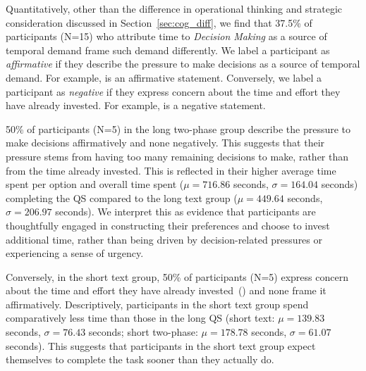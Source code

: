 Quantitatively, other than the difference in operational thinking and strategic consideration discussed in Section~\ref{sec:cog_diff}, we find that 37.5\% of participants (N=15) who attribute time to \textit{Decision Making} as a source of temporal demand frame such demand differently. We label a participant as \textit{affirmative} if they describe the pressure to make decisions as a source of temporal demand. For example,  is an affirmative statement. Conversely, we label a participant as \textit{negative} if they express concern about the time and effort they have already invested. For example,  is a negative statement.

50\% of participants (N=5) in the long two-phase group describe the pressure to make decisions affirmatively and none negatively. This suggests that their pressure stems from having too many remaining decisions to make, rather than from the time already invested. This is reflected in their higher average time spent per option and overall time spent ($\mu=716.86$ seconds, $\sigma=164.04$ seconds) completing the QS compared to the long text group ($\mu=449.64$ seconds, $\sigma=206.97$ seconds). We interpret this as evidence that participants are thoughtfully engaged in constructing their preferences and choose to invest additional time, rather than being driven by decision-related pressures or experiencing a sense of urgency.

Conversely, in the short text group, 50\% of participants (N=5) express concern about the time and effort they have already invested~() and none frame it affirmatively. Descriptively, participants in the short text group spend comparatively less time than those in the long QS (short text: $\mu=139.83$ seconds, $\sigma=76.43$ seconds; short two-phase: $\mu=178.78$ seconds, $\sigma=61.07$ seconds). This suggests that participants in the short text group expect themselves to complete the task sooner than they actually do. 


